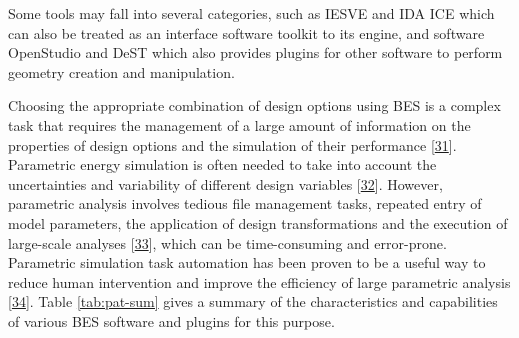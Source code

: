 \documentclass[3p, times]{elsarticle} %
\begin{document}
Some tools may fall into several categories, such as IESVE and IDA ICE which can
also be treated as an interface software toolkit to its engine, and software
OpenStudio and DeST which also provides plugins for other software to perform
geometry creation and manipulation.

Choosing the appropriate combination of design options using BES is a complex
task that requires the management of a large amount of information on the
properties of design options and the simulation of their performance
{[}\protect\hyperlink{ref-Purup2020}{31}{]}. Parametric energy simulation is often needed to take into account
the uncertainties and variability of different design variables
{[}\protect\hyperlink{ref-Tian2018review}{32}{]}. However, parametric analysis involves tedious file management
tasks, repeated entry of model parameters, the application of design
transformations and the execution of large-scale analyses {[}\protect\hyperlink{ref-Macumber2012}{33}{]}, which
can be time-consuming and error-prone. Parametric simulation task automation has
been proven to be a useful way to reduce human intervention and improve the
efficiency of large parametric analysis {[}\protect\hyperlink{ref-Roth2018}{34}{]}. Table \ref{tab:pat-sum}
gives a summary of the characteristics and capabilities of various BES software
and plugins for this purpose.








\setlength{\tabcolsep}{0.1pt}
\renewcommand{\arraystretch}{1.3}
\end{document}
